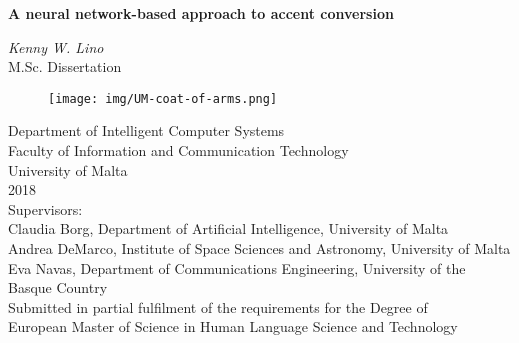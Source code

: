 \documentclass
[
    a4paper,
    twoside,
    12pt
]
{report}
\begin{document}
\begin{titlepage}
    \vspace*{1.0cm}
    \begin{center}
        \begin{Large}
        \textbf{A neural network-based approach to accent conversion} \\
        \end{Large}
        \vspace*{1.0cm}
        \textit{Kenny W. Lino} \\
        \vspace*{1.5cm}
        M.Sc. Dissertation \\
        \vspace*{0.5cm}
        \begin{figure}[H]
        \centering
        \texttt{[image: img/UM-coat-of-arms.png]}
    	\end{figure}
       \vspace*{1.0cm}
       Department of Intelligent Computer Systems \\
       Faculty of Information and Communication Technology \\
       University of Malta \\
       2018 \\
       
       \vspace*{2.0cm}
	   Supervisors: \\
       Claudia Borg, Department of Artificial Intelligence, University of Malta \\
       Andrea DeMarco, Institute of Space Sciences and Astronomy, University of Malta \\
       Eva Navas, Department of Communications Engineering, University of the Basque Country \\
       
       \vspace*{4.5cm}
       Submitted in partial fulfilment of the requirements for the Degree of \\
       European Master of Science in Human Language Science and Technology
    \end{center}



\end{titlepage}

\onehalfspacing
{}
\end{document}
